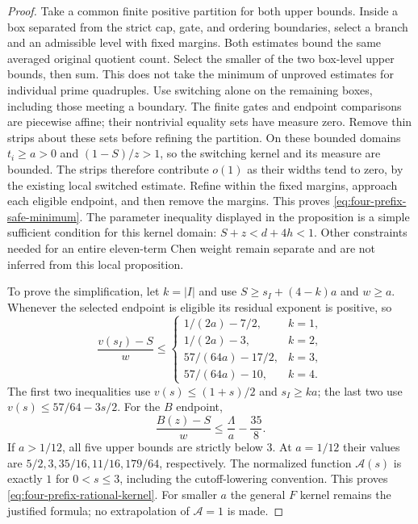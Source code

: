 \documentclass[11pt]{article}
\begin{document}
\begin{proof}
Take a common finite positive partition for both upper bounds.
Inside a box separated from the strict cap, gate, and ordering
boundaries, select a branch and an admissible level with fixed
margins.  Both estimates bound the same averaged original
quotient count.  Select the smaller of the two box-level upper
bounds, then sum.  This does not take the minimum of unproved
estimates for individual prime quadruples.
Use switching alone on the remaining boxes, including those
meeting a boundary.  The finite gates and endpoint comparisons
are piecewise affine; their nontrivial equality sets have measure
zero.  Remove thin strips about these sets before refining the
partition.  On these bounded domains $t_i\ge a>0$ and
$(1-S)/z>1$, so the switching kernel and its measure are bounded.
The strips therefore contribute $o(1)$ as their widths tend to
zero, by the existing local switched estimate.  Refine within the
fixed margins, approach each eligible endpoint, and then remove
the margins.  This proves \eqref{eq:four-prefix-safe-minimum}.
The parameter inequality displayed in the proposition is a simple
sufficient condition for this kernel domain: $S+z<d+4h<1$.
Other constraints needed for an entire eleven-term Chen weight
remain separate and are not inferred from this local proposition.

To prove the simplification, let $k=|I|$ and use
$S\ge s_I+(4-k)a$ and $w\ge a$.  Whenever the selected endpoint
is eligible its residual exponent is positive, so
\[
 \frac{v(s_I)-S}{w}\le
 \begin{cases}
  1/(2a)-7/2,&k=1,\\
  1/(2a)-3,&k=2,\\
  57/(64a)-17/2,&k=3,\\
  57/(64a)-10,&k=4.
 \end{cases}
\]
The first two inequalities use $v(s)\le(1+s)/2$ and
$s_I\ge ka$; the last two use $v(s)\le57/64-3s/2$.
For the $B$ endpoint,
\[
 \frac{B(z)-S}{w}\le\frac\Lambda a-\frac{35}{8}.
\]
If $a>1/12$, all five upper bounds are strictly below $3$.
At $a=1/12$ their values are $5/2,3,35/16,11/16,179/64$,
respectively.  The normalized function $\mathcal A(s)$ is exactly
$1$ for $0<s\le3$, including the cutoff-lowering convention.
This proves \eqref{eq:four-prefix-rational-kernel}.  For smaller
$a$ the general $F$ kernel remains the justified formula; no
extrapolation of $\mathcal A=1$ is made.
\end{proof}
\end{document}
